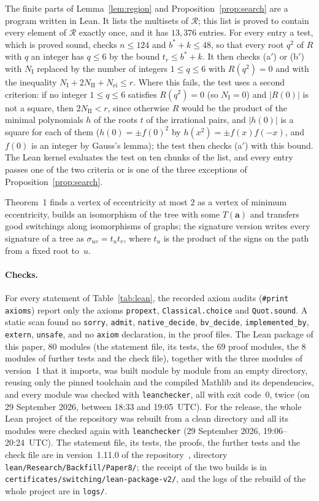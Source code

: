 \documentclass[11pt]{article}
\numberwithin{equation}{section}
\theoremstyle{remark}
\newcommand{\cR}{\mathcal R}
\newcommand{\bfa}{\mathbf a}
\newcommand{\NI}{N_{\mathrm I}}
\newcommand{\NII}{N_{\mathrm{II}}}
\newcommand{\Nei}{N_{\mathrm{ei}}}
\newcommand{\repoversion}{1.11.0}
\begin{document}
The finite parts of Lemma~\ref{lem:region} and Proposition~\ref{prop:search}
are a program written in Lean. It lists the multisets of $\cR$; this list is
proved to contain every element of $\cR$ exactly once, and it has $13{,}376$
entries. For every entry a test, which is proved sound, checks $n\le124$ and
$b^*+k\le48$, so that every root $q^2$ of $R$ with $q$ an integer has $q\le6$ by
the bound $t_r\le b^*+k$. It then checks (a$'$) or (b$'$) with $\NI$ replaced by
the number of integers $1\le q\le6$ with $R(q^2)=0$ and with the inequality
$\NI+2\NII+\Nei\le r$. Where this fails, the test uses a second criterion: if
no integer $1\le q\le6$ satisfies $R(q^2)=0$ (so $\NI=0$) and $|R(0)|$ is not a
square, then $2\NII<r$, since otherwise $R$ would be the product of the minimal
polynomials $h$ of the roots $t$ of the irrational pairs, and $|h(0)|$ is a
square for each of them ($h(0)=\pm f(0)^2$ by $h(x^2)=\pm f(x)f(-x)$, and
$f(0)$ is an integer by Gauss's lemma); the test then checks (a$'$) with this bound. The Lean
kernel evaluates the test on ten chunks of the list, and every entry passes
one of the two criteria or is one of the three exceptions of
Proposition~\ref{prop:search}.

Theorem~1 finds a vertex of eccentricity at most $2$ as a vertex of minimum
eccentricity, builds an isomorphism of the tree with some $T(\bfa)$ and
transfers good switchings along isomorphisms of graphs; the signature version
writes every signature of a tree as $\sigma_{uv}=t_ut_v$, where $t_u$ is the
product of the signs on the path from a fixed root to~$u$.

\paragraph{Checks.}
For every statement of Table~\ref{tab:lean}, the recorded axiom audits
(\texttt{\#print axioms}) report only the axioms \texttt{propext},
\texttt{Classical.choice} and \texttt{Quot.sound}. A static scan found no
\texttt{sorry}, \texttt{admit}, \texttt{native\_decide}, \texttt{bv\_decide},
\texttt{implemented\_by}, \texttt{extern}, \texttt{unsafe}, and no
\texttt{axiom} declaration, in the proof files. The Lean package of this paper,
$80$ modules (the statement file, its tests, the $69$ proof modules, the $8$
modules of further tests and the check file), together with the three modules
of version~1 that it imports, was built module by module from an empty
directory, reusing only the pinned toolchain and the compiled Mathlib and its
dependencies, and every module was checked with \texttt{leanchecker}, all with
exit code~$0$, twice (on 29 September 2026, between 18:33 and 19:05~UTC). For
the release, the whole Lean project of the repository was rebuilt from a clean
directory and all its modules were checked again with \texttt{leanchecker}
(29 September 2026, 19:06--20:24~UTC). The statement file, its tests, the
proofs, the further tests and the check file are in version~\repoversion{} of
the repository~\cite{repo}, directory \texttt{lean/Research/Backfill/Paper8/};
the receipt of the two builds is in
\texttt{certificates/switching/lean-package-v2/}, and the logs of the rebuild
of the whole project are in \texttt{logs/}.
\end{document}
